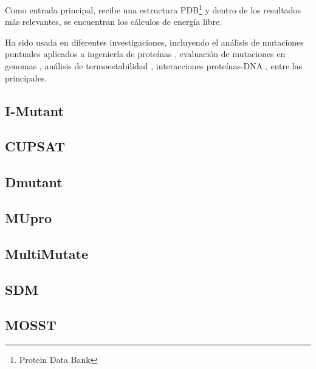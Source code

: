 Como entrada principal, recibe una estructura PDB\footnote{Protein Data Bank} y dentro de los resultados más relevantes, se encuentran los cálculos de energía libre.

Ha sido usada en diferentes investigaciones, incluyendo el análisis de mutaciones puntuales aplicados a ingeniería de proteínas \cite{BU201825, Alibes2010}, evaluación de mutaciones en genomas \cite{Sanchez2008}, análisis de termoestabilidad \cite{Bu2018, 10.1093/protein/gzv004}, interacciones proteínas-DNA \cite{NADRA20113}, entre las principales.

\subsection{I-Mutant}

\subsection{CUPSAT}

\subsection{Dmutant}

\subsection{MUpro}

\subsection{MultiMutate}

\subsection{SDM}

\subsection{MOSST}

